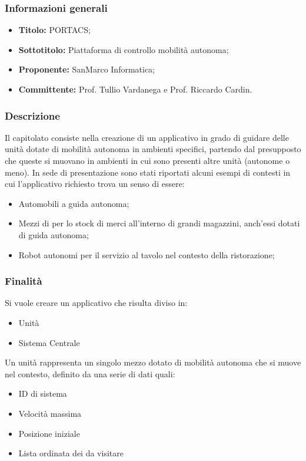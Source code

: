 \documentclass[]{article}
\begin{document}
			\subsubsection{Informazioni generali}
				\begin{itemize}
					\item \textbf{Titolo:} PORTACS;
					\item \textbf{Sottotitolo:} Piattaforma di controllo mobilità autonoma;
					\item \textbf{Proponente:} SanMarco Informatica;
					\item \textbf{Committente:} Prof. Tullio Vardanega e Prof. Riccardo Cardin.
				\end{itemize}
			
			\subsubsection{Descrizione}
			Il capitolato consiste nella creazione di un applicativo  in grado di guidare delle unità dotate di mobilità autonoma in ambienti specifici, partendo dal presupposto che queste si muovano in ambienti in cui sono presenti altre unità (autonome o meno). In sede di presentazione sono stati riportati alcuni esempi di contesti in cui l'applicativo richiesto trova un senso di essere:
			\begin{itemize}
				\item Automobili a guida autonoma; 
				\item Mezzi di per lo stock di merci all'interno di grandi magazzini, anch'essi dotati di guida autonoma;
				\item Robot autonomi per il servizio al tavolo nel contesto della ristorazione;  
			\end{itemize}
	
			\subsubsection{Finalità}
			Si vuole creare un applicativo che risulta diviso in:
			\begin{itemize}
				\item Unità
				\item Sistema Centrale
			\end{itemize}
			Un unità rappresenta un singolo mezzo dotato di mobilità autonoma che si muove nel contesto, definito da una serie di dati quali:
			 \begin{itemize}
			 	\item ID di sistema
			 	\item Velocità massima
			 	\item Posizione iniziale
			 	\item Lista ordinata dei  da visitare
			 \end{itemize}
			 
\end{document}
